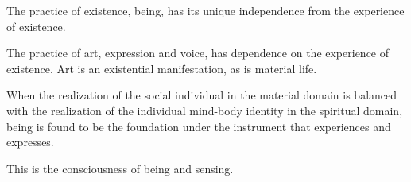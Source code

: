 

The practice of existence, being, has its unique independence from the
experience of existence.  

The practice of art, expression and voice, has dependence on the
experience of existence.  Art is an existential manifestation, as is
material life.

When the realization of the social individual in the material domain
is balanced with the realization of the individual mind-body identity
in the spiritual domain, being is found to be the foundation under the
instrument that experiences and expresses.  

This is the consciousness of being and sensing.


\bye
